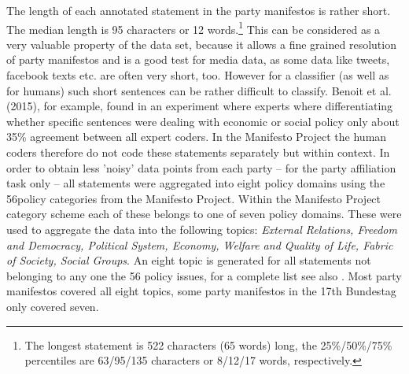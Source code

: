 \documentclass{article}
\begin{document}

The length of each annotated statement in the party manifestos is rather short. The median length is 95 characters or 12 words.\footnote{The longest statement is 522 characters (65 words) long, the 25\%/50\%/75\% percentiles are 63/95/135 characters or 8/12/17 words, respectively.} This can be considered as a very valuable property of the data set, because it allows a fine grained resolution of party manifestos and is a good test for media data, as some data like tweets, facebook texts etc. are often very short, too. However for a classifier (as well as for humans) such short sentences can be rather difficult to classify. Benoit et al. (2015), for example, found in an experiment where experts where differentiating whether specific sentences were dealing with economic or social policy only about 35\% agreement between all expert coders. In the Manifesto Project the human coders therefore do not code these statements separately but within context. In order to obtain less 'noisy' data points from each party -- for the party affiliation task only -- all statements were aggregated into eight policy domains using the 56policy categories from the Manifesto Project. Within the Manifesto Project category scheme each of these belongs to one of seven policy domains. These were used to aggregate the data into the following topics: {\em External Relations, Freedom and Democracy, Political System, Economy, Welfare and Quality of Life, Fabric of Society, Social Groups}. An eight topic is generated for all statements not belonging to any one the 56 policy issues, for a complete list see also \cite{leftright}. Most party manifestos covered all eight topics, some party manifestos in the 17th Bundestag only covered seven.
\end{document}
